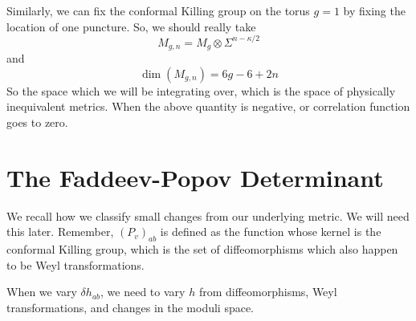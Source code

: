 \documentclass[11pt, oneside]{article}   	%
\theoremstyle{slanted}
\begin{document}
Similarly, we can fix the conformal Killing group 
on the torus $ g = 1  $ by fixing the location of one puncture. 
So, we should really take 
\[
 M _{ g, n  }  = M _ g \otimes \Sigma ^{ n  - \kappa / 2 } 
\] and 
\[
 \dim \left( M _{ g, n }  \right)   = 6g  - 6 + 2n 
\] So the space which we 
will be integrating over, which is 
the space of physically inequivalent metrics. 
When the above quantity is negative, 
or correlation function goes to zero. 

\pagebreak 


\section{The Faddeev-Popov Determinant}
We recall 
how we classify small changes from our underlying metric. 
We will need this later. 
Remember, $ \left( P _v  \right) _{ ab } $ is defined 
as the function whose kernel is the conformal 
Killing group, which is the set of diffeomorphisms 
which also happen to be Weyl transformations. 

When we vary $ \delta h _{ab } $, 
we need to vary $ h $ from diffeomorphisms, 
Weyl transformations, and changes in the moduli space.
\end{document}
